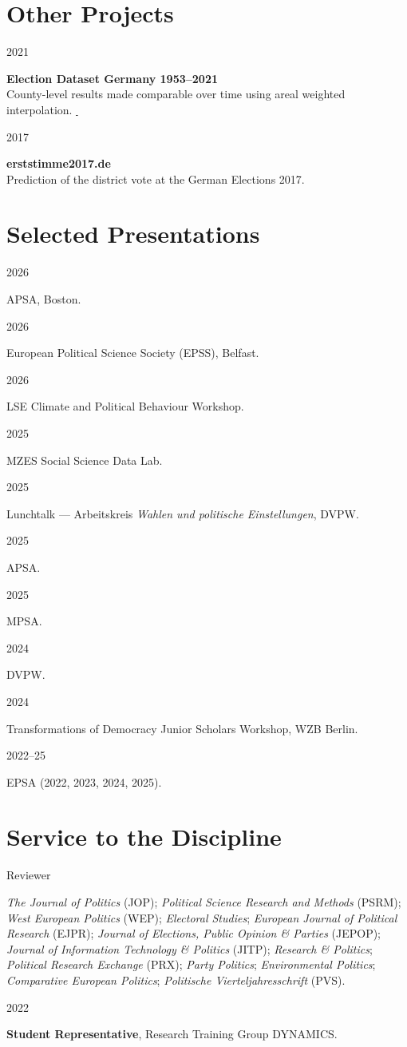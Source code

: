 \documentclass[11pt,a4paper]{article}
\newlength{\cvleftw}\setlength{\cvleftw}{0.20\textwidth}
\newlength{\cvrightw}\setlength{\cvrightw}{0.76\textwidth}
\newlength{\cvgap}\setlength{\cvgap}{0.02\textwidth}
\newenvironment{cventries}{\par\setlength{\parskip}{0pt}}{\par}
\newcommand{\cvitem}[2]{%
  \par\nopagebreak[2]%
  \noindent
  \begin{minipage}[t]{\cvleftw}\raggedright\color{cvmuted}\small\vspace{0pt}\strut #1\end{minipage}%
  \hspace{\cvgap}%
  \begin{minipage}[t]{\cvrightw}\raggedright\vspace{0pt}\strut #2\end{minipage}%
  \par\vspace{10pt plus 3pt minus 2pt}%
}
\newcommand{\cvtitle}[1]{\textbf{#1}}
\begin{document}
\section*{Other Projects}
\begin{cventries}
\cvitem{2021}{%
  \cvtitle{Election Dataset Germany 1953--2021} \\
  County-level results made comparable over time using areal weighted interpolation.
  \href{https://github.com/cornelius-erfort/election-data-germany}{\,\faGithub}}
\cvitem{2017}{%
  \cvtitle{erststimme2017.de} \\
  Prediction of the district vote at the German Elections 2017.}
\end{cventries}

\section*{Selected Presentations}
\begin{cventries}
\cvitem{2026}{APSA, Boston.}
\cvitem{2026}{European Political Science Society (EPSS), Belfast.}
\cvitem{2026}{LSE Climate and Political Behaviour Workshop.}
\cvitem{2025}{MZES Social Science Data Lab.}
\cvitem{2025}{Lunchtalk --- Arbeitskreis \emph{Wahlen und politische Einstellungen}, DVPW.}
\cvitem{2025}{APSA.}
\cvitem{2025}{MPSA.}
\cvitem{2024}{DVPW.}
\cvitem{2024}{Transformations of Democracy Junior Scholars Workshop, WZB Berlin.}
\cvitem{2022--25}{EPSA (2022, 2023, 2024, 2025).}
\end{cventries}

\section*{Service to the Discipline}
\begin{cventries}
\cvitem{Reviewer}{%
  \emph{The Journal of Politics} (JOP); \emph{Political Science Research and Methods} (PSRM);
  \emph{West European Politics} (WEP); \emph{Electoral Studies};
  \emph{European Journal of Political Research} (EJPR);
  \emph{Journal of Elections, Public Opinion \& Parties} (JEPOP);
  \emph{Journal of Information Technology \& Politics} (JITP);
  \emph{Research \& Politics}; \emph{Political Research Exchange} (PRX); \emph{Party Politics};
  \emph{Environmental Politics}; \emph{Comparative European Politics};
  \emph{Politische Vierteljahresschrift} (PVS).}
\cvitem{2022}{%
  \cvtitle{Student Representative}, Research Training Group DYNAMICS.}
\end{cventries}
\end{document}
